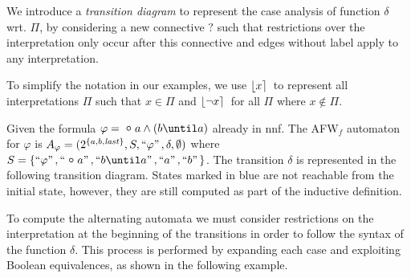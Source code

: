 \begin{definition}
\begin{itemize}
    \end{itemize}


\end{definition}


We introduce a \emph{transition diagram} to represent the case analysis of function $\delta$ wrt. $\Pi$, by considering a new connective $?$ such that restrictions over the interpretation only occur after this connective and edges without label apply to any interpretation. 

To simplify the notation in our examples, we use $\lfloor x \rceil\,$ to represent all interpretations $\Pi$ such that $x\in\Pi$ and $\lfloor \neg x \rceil\,$ for all $\Pi$ where $x\not\in\Pi$.

\begin{example}
    Given the formula $\varphi= \Next a \wedge (b \until a)$ already in nnf. The AFW$_f$ automaton for $\varphi$ is $A_\varphi =(2^{\{a,b,\mathit{last}\}},S,``\varphi"\,,\delta,\emptyset)$ where $S=\{\s{\varphi},\s{\Next a},\s{b \until a},\s{a},\s{b}\}$. The transition $\delta$ is represented in the following transition diagram. States marked in blue are not reachable from the initial state, however, they are still computed as part of the inductive definition.

    


\end{example}

To compute the alternating automata we must consider restrictions on the interpretation at the beginning of the transitions in order to follow the syntax of the function $\delta$. This process is performed by expanding each case and exploiting Boolean equivalences, as shown in the following example.


